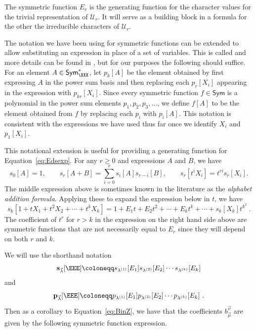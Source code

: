 The symmetric function $E_r$ is the generating function
for the character values for the trivial representation of $\mathcal{U}_r$. It will serve as
a building block in a formula for the other the irreducible characters of $\mathcal{U}_r$.

The notation we have been using for symmetric functions can be extended
to allow substituting an expression in place of a set of variables.
This is called  and more details can be found in \cite{LR},
but for our purposes the following should suffice.
For an element $A \in \mathsf{Sym}^{\ast}_{\XXX}$, let $p_k[A]$ be the element
obtained by first expressing $A$ in the power sum basis and then
replacing each $p_r[X_i]$ appearing in the expression with $p_{kr}[X_i]$.
Since every symmetric function $f \in \mathsf{Sym}$ is a polynomial in the power sum elements
$p_1, p_2, p_3, \ldots$, we define $f[A]$ to be the element obtained from $f$ by
replacing each $p_i$ with $p_i[A]$.
This notation is consistent with the expressions we have used thus far once we identify $X_i$ and $p_1[X_i]$.

\begin{remark}
This notational extension is useful for
providing a generating function for
Equation~\eqref{eq:Edsexp}.  For any $r\geqslant0$ and
expressions $A$ and $B$, we have
\begin{equation*}
s_0[A] = 1,
\qquad
s_r[A+B] = \sum_{i=0}^r s_i[A] s_{r-i}[B],
\qquad
s_r[t^i X_i] = t^{ri} s_r[X_i].
\end{equation*}
The middle expression above is sometimes known in the literature as the
\emph{alphabet addition formula}. Applying these to expand the
expression below in $t$, we have
\[
    s_k[1 + t X_1 + t^2 X_2 + \cdots + t^k X_k]
    = 1 + E_1 t + E_2 t^2 + \cdots + E_k t^k + \cdots + s_k[X_k] t^{k^2}~.
\]
The coefficient of $t^r$ for $r>k$ in the expression on the
right hand side above are symmetric functions that are
not necessarily equal to $E_r$ since they will depend on both $r$ and $k$.
\end{remark}

We will use the shorthand notation
$$\mathbf{s}_{\vec{\lambda}}[\EEE] \coloneqq s_{\lambda^{(1)}}[E_1]s_{\lambda^{(2)}}[E_2]
\cdots s_{\lambda^{(k)}}[E_k]$$
and
$$\mathbf{p}_{\vec{\lambda}}[\EEE] \coloneqq p_{\lambda^{(1)}}[E_1]p_{\lambda^{(2)}}[E_2]
\cdots p_{\lambda^{(k)}}[E_k]~.$$
Then as a corollary to Equation~\eqref{eq:BinZ}, we have that the
coefficients $b_{\vec{\mu}}^{\vec{\nu}}$ are given by the following symmetric function expression.


